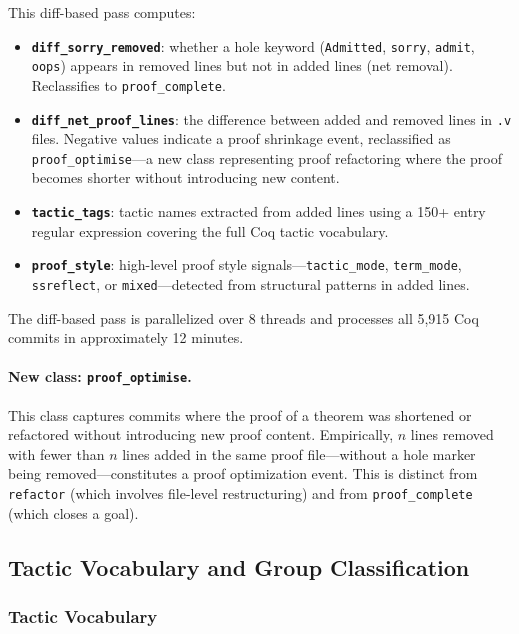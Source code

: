 \documentclass[11pt]{article}
\begin{document}
This diff-based pass computes:
\begin{itemize}
  \item \textbf{\texttt{diff\_sorry\_removed}}: whether a hole keyword (\texttt{Admitted}, \texttt{sorry}, \texttt{admit}, \texttt{oops}) appears in removed lines but not in added lines (net removal). Reclassifies to \texttt{proof\_complete}.
  \item \textbf{\texttt{diff\_net\_proof\_lines}}: the difference between added and removed lines in \texttt{.v} files. Negative values indicate a proof shrinkage event, reclassified as \texttt{proof\_optimise}---a new class representing proof refactoring where the proof becomes shorter without introducing new content.
  \item \textbf{\texttt{tactic\_tags}}: tactic names extracted from added lines using a 150+ entry regular expression covering the full Coq tactic vocabulary.
  \item \textbf{\texttt{proof\_style}}: high-level proof style signals---\texttt{tactic\_mode}, \texttt{term\_mode}, \texttt{ssreflect}, or \texttt{mixed}---detected from structural patterns in added lines.
\end{itemize}

The diff-based pass is parallelized over 8 threads and processes all 5,915 Coq commits in approximately 12 minutes.

\paragraph{New class: \texttt{proof\_optimise}.} This class captures commits where the proof of a theorem was shortened or refactored without introducing new proof content. Empirically, $n$ lines removed with fewer than $n$ lines added in the same proof file---without a hole marker being removed---constitutes a proof optimization event. This is distinct from \texttt{refactor} (which involves file-level restructuring) and from \texttt{proof\_complete} (which closes a goal).

\subsection{Tactic Vocabulary and Group Classification}

\subsubsection{Tactic Vocabulary}
\end{document}
